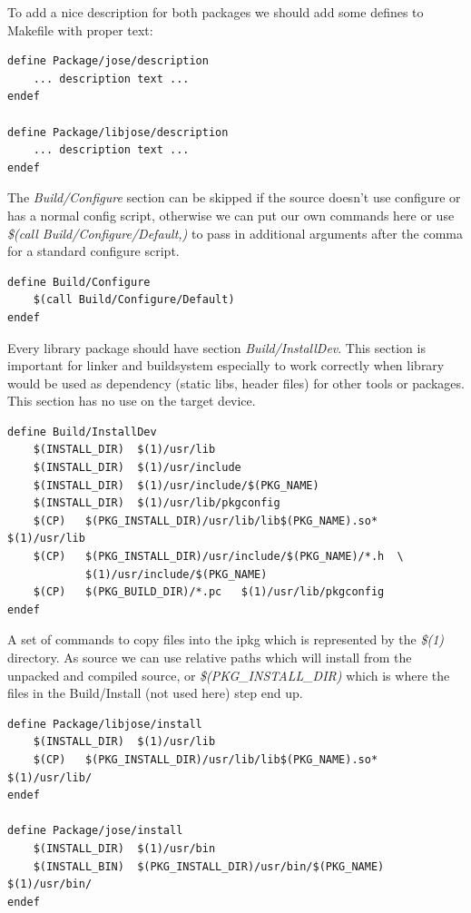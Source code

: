 To add a nice description for both packages we should add some defines to Makefile with proper text:
\begin{lstlisting}[columns=fixed,basicstyle=\ttfamily\footnotesize,tabsize=4,backgroundcolor=\color{yellow!10}]
define Package/jose/description
	... description text ...
endef

define Package/libjose/description
	... description text ...
endef
\end{lstlisting}
The {\it Build/Configure} section can be skipped if the source doesn't use configure or has a normal config script, otherwise we can put our own commands here or use {\it \$(call Build/Configure/Default,)} to pass in additional arguments after the comma for a standard configure script.
\begin{lstlisting}[columns=fixed,basicstyle=\ttfamily\footnotesize,tabsize=4,backgroundcolor=\color{yellow!10}]
define Build/Configure
	$(call Build/Configure/Default)
endef
\end{lstlisting}
Every library package should have section {\it Build/InstallDev}.
This section is important for linker and buildsystem especially to work correctly when library would be used as dependency (static libs, header files) for other tools or packages.
This section has no use on the target device.
\begin{lstlisting}[columns=fixed,basicstyle=\ttfamily\footnotesize,tabsize=4,backgroundcolor=\color{yellow!10}]
define Build/InstallDev
	$(INSTALL_DIR)	$(1)/usr/lib
	$(INSTALL_DIR)  $(1)/usr/include
	$(INSTALL_DIR)	$(1)/usr/include/$(PKG_NAME)
	$(INSTALL_DIR)	$(1)/usr/lib/pkgconfig
	$(CP)	$(PKG_INSTALL_DIR)/usr/lib/lib$(PKG_NAME).so*	$(1)/usr/lib
	$(CP)	$(PKG_INSTALL_DIR)/usr/include/$(PKG_NAME)/*.h	\
			$(1)/usr/include/$(PKG_NAME)
	$(CP)	$(PKG_BUILD_DIR)/*.pc	$(1)/usr/lib/pkgconfig
endef
\end{lstlisting}
A set of commands to copy files into the ipkg which is represented by the {\it \$(1)} directory.
As source we can use relative paths which will install from the unpacked and compiled source, or {\it \$(PKG\_INSTALL\_DIR)} which is where the files in the Build/Install (not used here) step end up.
\begin{lstlisting}[columns=fixed,basicstyle=\ttfamily\footnotesize,tabsize=4,backgroundcolor=\color{yellow!10}]
define Package/libjose/install
	$(INSTALL_DIR)	$(1)/usr/lib
	$(CP)	$(PKG_INSTALL_DIR)/usr/lib/lib$(PKG_NAME).so*	$(1)/usr/lib/
endef

define Package/jose/install
	$(INSTALL_DIR)	$(1)/usr/bin
	$(INSTALL_BIN)	$(PKG_INSTALL_DIR)/usr/bin/$(PKG_NAME)	$(1)/usr/bin/
endef
\end{lstlisting}

